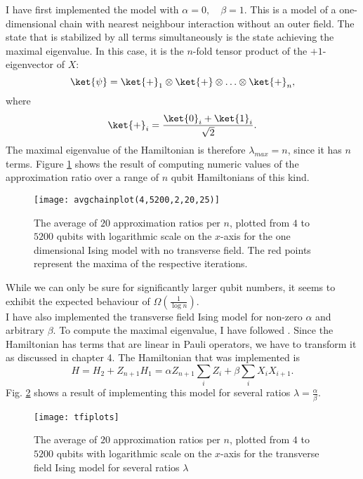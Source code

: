 I have first implemented the model with $\alpha =0, \quad \beta =1$.
This is a model of a one-dimensional chain with nearest neighbour interaction without an outer field.
The state that is stabilized by all terms simultaneously is the state achieving the maximal eigenvalue.
In this case, it is the $n$-fold tensor product of the $+1$-eigenvector of $X$: \[
	\ket{\psi}= \ket{+}_1\otimes\ket{+}\otimes\ldots\otimes\ket{+}_n
,\] where \[
\ket{+}_i= \frac{\ket{0}_i+\ket{1}_i}{\sqrt{2}}
.\]
The maximal eigenvalue of the Hamiltonian is therefore $\lambda_{max}=n$, since it has $n$ terms.
Figure \ref{fig:1} shows the result of computing numeric values of the approximation ratio over a range of $n$ qubit Hamiltonians of this kind.
\begin{figure}[H]
	\centering
	\texttt{[image: avgchainplot(4,5200,2,20,25)]}
	\caption{The average of $20$ approximation ratios per $n$, plotted from $4$ to $5200$ qubits with logarithmic scale on the $x$-axis for the one dimensional Ising model with no transverse field. The red points represent the maxima of the respective iterations.}
	\label{fig:1}
\end{figure}
\noindent While we can only be sure for significantly larger qubit numbers, it seems to exhibit the expected behaviour of $\Omega(\frac{1}{\log{}n})$.\\
I have also implemented the transverse field Ising model for non-zero $\alpha$ and arbitrary $\beta$.
To compute the maximal eigenvalue, I have followed \cite{pfeuty70}.
Since the Hamiltonian has terms that are linear in Pauli operators, we have to transform it as discussed in chapter 4.
The Hamiltonian that was implemented is \[
H = H_2 + Z_{n+1}H_1 =\alpha Z_{n+1}\sum_{i} Z_i + \beta \sum_{i} X_iX_{i+1}
.\]
Fig. \ref{fig:2} shows a result of implementing this model for several ratios $\lambda= \frac{\alpha}{\beta}$.
\begin{figure}[H]
	\centering
	\texttt{[image: tfiplots]}
	\caption{The average of $20$ approximation ratios per $n$, plotted from $4$ to $5200$ qubits with logarithmic scale on the $x$-axis for the transverse field Ising model for several ratios $\lambda$}
	\label{fig:2}
\end{figure}

